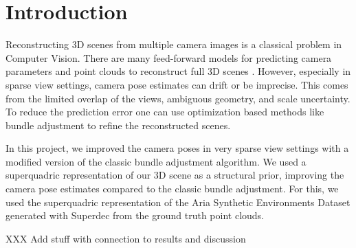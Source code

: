 \section{Introduction}
Reconstructing 3D scenes from multiple camera images is a classical problem in Computer Vision. There are many feed-forward models for predicting camera parameters and point clouds to reconstruct full 3D scenes \cite{wang2025vggtvisualgeometrygrounded, wang2026pi3permutationequivariantvisualgeometry, keetha2026mapanythinguniversalfeedforwardmetric}. However, especially in sparse view settings, camera pose estimates can drift or be imprecise. This comes from the limited overlap of the views, ambiguous geometry, and scale uncertainty. To reduce the prediction error one can use optimization based methods like bundle adjustment \cite{10.1007/3-540-44480-7_21} to refine the reconstructed scenes.

In this project, we improved the camera poses in very sparse view settings with a modified version of the classic bundle adjustment algorithm. We used a superquadric \cite{Paschalidou2019CVPR} representation of our 3D scene as a structural prior, improving the camera pose estimates compared to the classic bundle adjustment. For this, we used the superquadric representation of the Aria Synthetic Environments Dataset\cite{avetisyan2024scenescriptreconstructingscenesautoregressive} generated with Superdec \cite{fedele2026superdec3dscenedecomposition} from the ground truth point clouds.

XXX Add stuff with connection to results and discussion